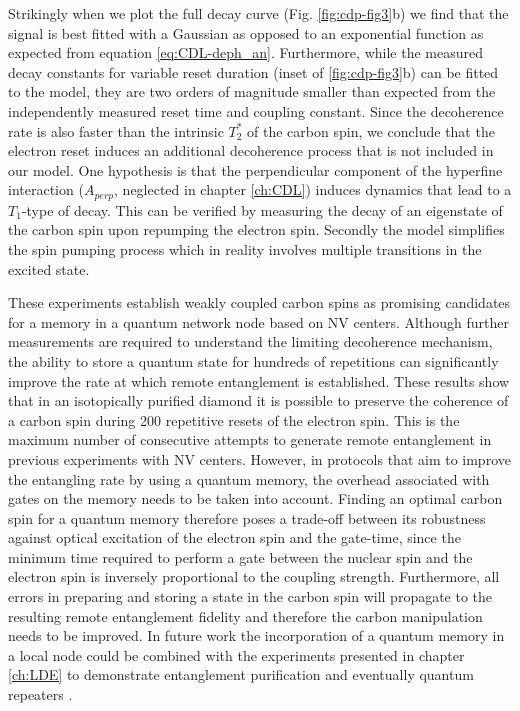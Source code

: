 Strikingly when we plot the full decay curve (Fig. \ref{fig:cdp-fig3}b) we find that the signal is best fitted with a Gaussian as opposed to an exponential function as expected from equation \ref{eq:CDL-deph_an}. Furthermore, while the measured decay constants for variable reset duration (inset of \ref{fig:cdp-fig3}b) can be fitted to the model, they are two orders of magnitude smaller than expected from the independently measured reset time and coupling constant. Since the decoherence rate is also faster than the intrinsic $T_2^{*}$ of the carbon spin, we conclude that the electron reset induces an additional decoherence process that is not included in our model. One hypothesis is that the perpendicular component of the hyperfine interaction ($A_{perp}$, neglected in chapter \ref{ch:CDL}) induces dynamics that lead to a $T_1$-type of decay. This can be verified by measuring the decay of an eigenstate of the carbon spin upon repumping the electron spin. Secondly the model simplifies the spin pumping process which in reality involves multiple transitions in the excited state. 

These experiments establish weakly coupled carbon spins as promising candidates for a memory in a quantum network node based on NV centers. Although further measurements are required to understand the limiting decoherence mechanism, the ability to store a quantum state for hundreds of repetitions can significantly improve the rate at which remote entanglement is established. These results show that in an isotopically purified diamond it is possible to preserve the coherence of a carbon spin during 200 repetitive resets of the electron spin. This is the maximum number of consecutive attempts to generate remote entanglement in previous experiments with NV centers\cite{Bernien_Nature_2013,Pfaff_Science_2014}. However, in protocols that aim to improve the entangling rate by using a quantum memory, the overhead associated with gates on the memory needs to be taken into account. Finding an optimal carbon spin for a quantum memory therefore poses a trade-off between its robustness against optical excitation of the electron spin and the gate-time, since the minimum time required to perform a gate between the nuclear spin and the electron spin is inversely proportional to the coupling strength. Furthermore, all errors in preparing and storing a state in the carbon spin will propagate to the resulting remote entanglement fidelity and therefore the carbon manipulation needs to be improved. In future work the incorporation of a quantum memory in a local node could be combined with the experiments presented in chapter \ref{ch:LDE} to demonstrate entanglement purification\cite{Campbell_Phys.Rev.Lett._2008} and eventually quantum repeaters \cite{Briegel_Phys.Rev.Lett._1998}.

\clearpage





